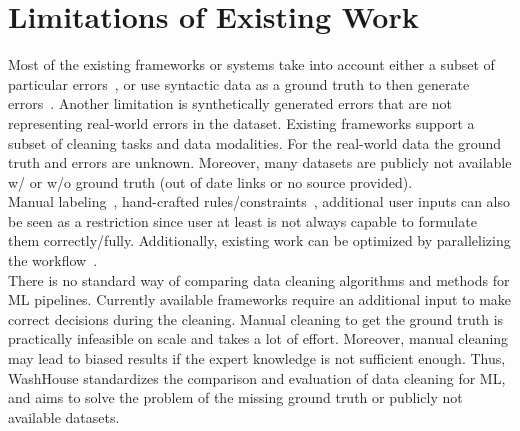 \section{Limitations of Existing Work}

Most of the existing frameworks or systems take into account either a subset of particular errors~\cite{boostclean, raha, baran, jenga}, or use syntactic data as a ground truth to then generate errors~\cite{gouda, bart}. 
Another limitation is synthetically generated errors that are not representing real-world errors in the dataset. Existing frameworks support a subset of cleaning tasks and data modalities.
For the real-world data the ground truth and errors are unknown. Moreover, many datasets are publicly not available w/ or w/o ground truth (out of date links or no source provided).
\\
Manual labeling~\cite{raha, baran}, hand-crafted rules/constraints~\cite{bart, gouda}, additional user inputs can also be seen as a restriction 
since user at least is not always capable to formulate them correctly/fully. %
Additionally, existing work can be optimized by parallelizing the workflow~\cite{raha, baran, holoclean, holodetect, gouda, jenga}.
\\
There is no standard way of comparing data cleaning algorithms and methods for ML pipelines. 
Currently available frameworks require an additional input to make correct decisions during the cleaning. Manual cleaning to get the ground truth is practically infeasible on scale and takes a lot of effort.
Moreover, manual cleaning may lead to biased results if the expert knowledge is not sufficient enough.
Thus, WashHouse standardizes the comparison and evaluation of data cleaning for ML, and aims to solve the problem of the missing ground truth or publicly not available datasets.
